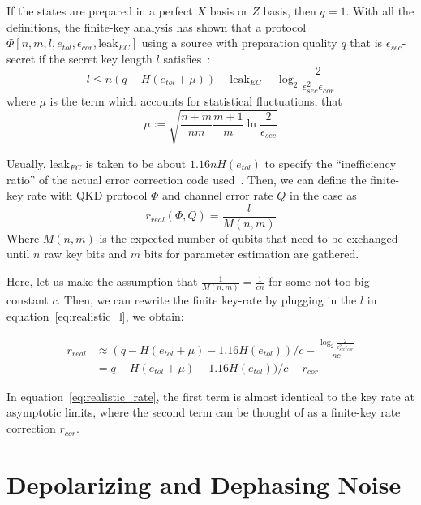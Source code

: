 \documentclass[%
 reprint,
superscriptaddress,
 amsmath,amssymb,
 aps,
]{revtex4-2}
\begin{document}
If the states are prepared in a perfect $X$ basis or $Z$ basis, then $q=1$. With all the definitions, the finite-key analysis has shown that a protocol $\Phi[n, m, l, e_{tol}, \epsilon_{cor}, \text{leak}_{EC}]$ using a source with  preparation quality $q$ that is $\epsilon_{sec}$-secret if the secret key length $l$ satisfies~\cite{Finite_key_analysis1}:
\begin{equation}
    l\le n(q-H(e_{tol}+\mu))-\text{leak}_{EC}-\log_2 \frac{2}{\epsilon_{sec}^2\epsilon_{cor}}
    \label{eq:realistic_l}
\end{equation}
where $\mu$ is the term which accounts for statistical fluctuations, that
\begin{equation}
    \mu := \sqrt{\frac{n+m}{nm}\frac{m+1}{m}\ln\frac{2}{\epsilon_{sec}}}
\end{equation}

Usually, $\text{leak}_{EC}$ is taken to be about $1.16nH(e_{tol})$ to specify the ``inefficiency ratio'' of the actual error correction code used~\cite{Finite_key_analysis1}. Then, we can define the finite-key rate with QKD protocol $\Phi$ and channel error rate $Q$ in the case as
\begin{equation}
    r_{real}(\Phi, Q) =\frac{l}{M(n, m)}
\end{equation}
Where $M(n, m)$ is the expected number of qubits that need to be exchanged until $n$ raw key bits and $m$ bits for parameter estimation are gathered.

Here, let us make the assumption that $\frac{1}{M(n, m)}=\frac{1}{cn}$ for some not too big constant $c$. Then, we can rewrite the finite key-rate by plugging in the $l$ in equation~\ref{eq:realistic_l}, we obtain:

\begin{equation}
\begin{split}
    r_{real}&\approx (q-H(e_{tol}+\mu)-1.16H(e_{tol}))/c-\frac{\log_2 \frac{2}{\epsilon_{sec}^2\epsilon_{cor}}}{nc}\\
    &= q-H(e_{tol}+\mu)-1.16H(e_{tol}))/c-r_{cor}
    \end{split}
    \label{eq:realistic_rate}
\end{equation}

In equation~\ref{eq:realistic_rate}, the first term is almost identical to the key rate at asymptotic limits, where the second term can be thought of as a finite-key rate correction $r_{cor}$.


\section{Depolarizing and Dephasing Noise}
\label{sec:Depolarizing_and_Dephasing_Noise}
\end{document}
